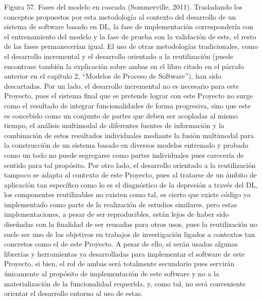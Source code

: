 Figura 57. Fases del modelo en cascada (Sommerville, 2011).
Trasladando los conceptos propuestos por esta metodología al contexto del desarrollo de un sistema de software basado en DL, la fase de implementación correspondería con el entrenamiento del modelo y la fase de prueba con la validación de este, el resto de las fases permanecerían igual.
El uso de otras metodologías tradicionales, como el desarrollo incremental y el desarrollo orientado a la reutilización (puede encontrase también la explicación sobre ambas en el libro citado en el párrafo anterior en el capítulo 2, “Modelos de Proceso de Software”), han sido descartadas. Por un lado, el desarrollo incremental no es necesario para este Proyecto, pues el sistema final que se pretende lograr con este Proyecto no surge como el resultado de integrar funcionalidades de forma progresiva, sino que este es concebido como un conjunto de partes que deben ser acopladas al mismo tiempo, el análisis multimodal de diferentes fuentes de información y la combinación de estos resultados individuales mediante la fusión multimodal para la construcción de un sistema basado en diversos modelos entrenado y probado como un todo no puede segregarse como partes individuales pues carecería de sentido para tal propósito.
Por otro lado, el desarrollo orientado a la reutilización tampoco se adapta al contexto de este Proyecto, pues al tratarse de un ámbito de aplicación tan específico como lo es el diagnóstico de la depresión a través del DL, los componentes reutilizables no existen como tal, es cierto que existe código ya implementado como parte de la realización de estudios similares, pero estas implementaciones, a pesar de ser reproducibles, están lejos de haber sido diseñadas con la finalidad de ser reusadas para otros usos, pues la reutilización no suele ser uno de los objetivos en trabajos de investigación ligados a contextos tan concretos como el de este Proyecto. A pesar de ello, sí serán usadas algunas librerías y herramientas ya desarrolladas para implementar el software de este Proyecto, si bien, el rol de ambas será totalmente secundario pues servirán únicamente al propósito de implementación de este software y no a la materialización de la funcionalidad requerida, y, como tal, no será conveniente orientar el desarrollo entorno al uso de estas.
